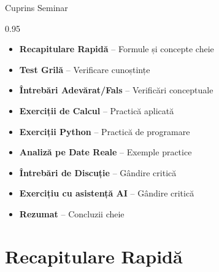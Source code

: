 \documentclass[9pt, aspectratio=169, t]{beamer}
\subtitle{Seminar 1: Introducere în Seriile de Timp}
\begin{document}
{
\begin{frame}
    \titlepage
\end{frame}
}


\begin{frame}{Cuprins Seminar}
    \begin{cminipage}{0.95\textwidth}
    \begin{itemize}\setlength{\itemsep}{0pt}
        \item \textbf{Recapitulare Rapidă} -- Formule și concepte cheie
        \vspace{0.15cm}
        \item \textbf{Test Grilă} -- Verificare cunoștințe
        \vspace{0.15cm}
        \item \textbf{Întrebări Adevărat/Fals} -- Verificări conceptuale
        \vspace{0.15cm}
        \item \textbf{Exerciții de Calcul} -- Practică aplicată
        \vspace{0.15cm}
        \item \textbf{Exerciții Python} -- Practică de programare
        \vspace{0.15cm}
        \item \textbf{Analiză pe Date Reale} -- Exemple practice
        \vspace{0.15cm}
        \item \textbf{Întrebări de Discuție} -- Gândire critică
        \vspace{0.15cm}
        \item \textbf{Exercițiu cu asistență AI} -- Gândire critică
        \vspace{0.15cm}
        \item \textbf{Rezumat} -- Concluzii cheie
    \end{itemize}
    \end{cminipage}
\end{frame}

\section{Recapitulare Rapidă}
\end{document}
